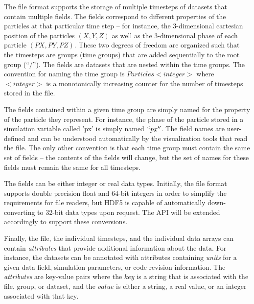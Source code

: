 \documentclass[acus]{JAC2003}
\begin{document}
The file format supports the storage of multiple timesteps of
datasets that contain multiple fields. The fields correspond to different properties of
the particles at that particular time step -- for instance, 
the 3-dimensional cartesian position of the particles 
$(X,Y,Z)$ as well as the 3-dimensional phase of each 
particle $(PX,PY,PZ)$. These two degrees of freedom
are organized such that the timesteps are groups (time groups) that are added sequentially
to the root group (``/'').  The fields are datasets that are nested within the 
time groups.  The convention for naming the time group is $Particles<integer>$ where $<integer>$ is a monotonically increasing counter for the number of timesteps stored in the file.  

The fields contained within a given time group are simply named for the property of the particle they represent.   For instance, the phase of the particle stored in a simulation variable called 'px' is simply named $``px''$. The field names are user-defined and 
can be understood automatically by the visualization 
tools that read the file. The only other convention is that each time group must contain the same set of fields -- the contents of the fields will change, but the set of names for these fields must remain the same for all timesteps.

The fields can be either integer or real data types.  Initially, the file format supports double precision float and 64-bit integers in order to simplify the requirements for file readers, but HDF5 is capable of automatically down-converting to 32-bit data types upon request.  The API will be extended accordingly to support these conversions.

Finally, the file, the individual timesteps, and the individual data arrays can contain {\em attributes} that provide additional information about the data.  For instance, the datasets can be annotated with attributes containing {\em units} for a given data field, simulation parameters, or code revision information.  The {\em attributes} are key-value pairs where the $key$ is a string that is associated with the file, group, or dataset, and the $value$ is either a string, a real value, or an integer associated with that key.  

\end{document}
